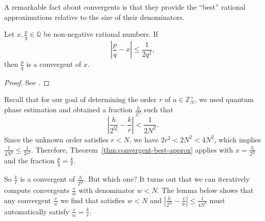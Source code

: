 \documentclass[a4paper, oneside, 12pt]{amsart}
\begin{document}
A remarkable fact about convergents is that they provide the ``best'' rational approximations  relative to the size of their denominators.

\begin{theorem}\label{thm:convergent-best-approx}
  Let \(x, \frac{p}{q} \in \mathbb{Q}\) be non-negative rational numbers.
  If
  \begin{equation*}
    \left|\frac{p}{q} - x \right| \leq \frac{1}{2 q^{2}},
  \end{equation*}
  then \(\frac{p}{q}\) is a convergent of \(x\).
\end{theorem}
\begin{proof}
  See \cite[Theorem~A4.16]{nielsen-chuang2000:QuantumComputationInformation}.
\end{proof}

Recall that for our goal of determining the order \(r\) of \(a\in \mathbb{Z}_{N}^{\times}\), we used quantum phase estimation and obtained a fraction \(\frac{h}{2^{Q}}\) such that
\begin{equation}
  \left|\frac{h}{2^Q} - \frac{k}{r}\right| < \frac{1}{2N^{2}}.
\end{equation}
Since the unknown order satisfies \(r < N\), we have \(2r^2 < 2N^2 < 4N^2\), which implies \(\frac{1}{4N^2} \leq \frac{1}{2r^2}\). Therefore, Theorem~\ref{thm:convergent-best-approx} applies with \(x = \frac{h}{2^Q}\) and the fraction \(\frac{p}{q} = \frac{k}{r}\).

So \(\frac{k}{r}\) is a convergent of \(\frac{h}{2^Q}\). But which one?
It turns out that we can iteratively compute convergents \(\frac{v}{w}\) with denominator \(w<N\).
The lemma below shows that any convergent \(\frac{v}{w}\) we find that satisfies \(w<N\) and \( \left|\frac{h}{2^Q} - \frac{v}{w}\right| \leq \frac{1}{4N^{2}}\) must automatically satisfy \(\frac{v}{w} = \frac{k}{r}\).
\end{document}

